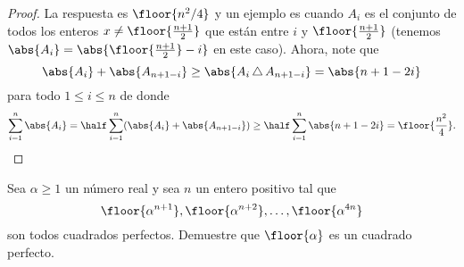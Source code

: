 \begin{proof}
	La respuesta es $\floor{n^2/4}$ y un ejemplo es cuando $A_i$ es el conjunto de todos los enteros $x\ne\floor{\frac{n+1}{2}}$ que están entre $i$ y $\floor{\frac{n+1}{2}}$ (tenemos $\abs{A_i}=\abs{\floor{\frac{n+1}{2}}-i}$ en este caso). Ahora, note que
	\[\abs{A_i}+\abs{A_{n+1-i}}\ge\abs{A_i\,\triangle\,A_{n+1-i}}=\abs{n+1-2i}\]
	para todo $1\le i\le n$ de donde
	\[\sum_{i=1}^n\abs{A_i}=\half\sum_{i=1}^n(\abs{A_i}+\abs{A_{n+1-i}})\ge\half\sum_{i=1}^n\abs{n+1-2i}=\floor{\frac{n^2}{4}}.\]
\end{proof}

\begin{problem}
	Sea $\alpha\ge 1$ un número real y sea $n$ un entero positivo tal que
	\[\floor{\alpha^{n+1}},\floor{\alpha^{n+2}},\dots,\floor{\alpha^{4n}}\]
	son todos cuadrados perfectos. Demuestre que $\floor{\alpha}$ es un cuadrado perfecto.
\end{problem}
